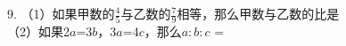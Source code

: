 9. （1）如果甲数的$\frac{4}{5}$与乙数的$\frac{7}{9}$相等，那么甲数与乙数的比是\key{\hspace{2cm}} \\

\hspace*{4mm}（2）如果2$a$=3$b$，3$a$=4$c$，那么$a:b:c$ = \key{\hspace{2cm}}



